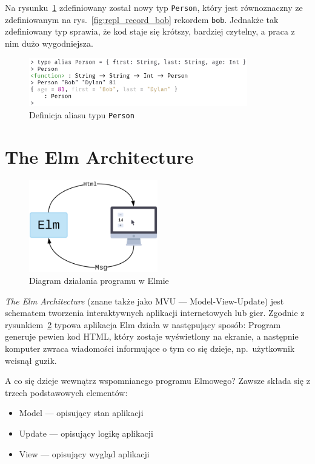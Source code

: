 \documentclass[twoside,a4paper]{report}
\begin{document}
Na rysunku~\ref{fig:repl_type_alias} zdefiniowany został nowy typ \texttt{Person}, który jest równoznaczny ze zdefiniowanym na rys.~\ref{fig:repl_record_bob} rekordem \texttt{bob}.
Jednakże tak zdefiniowany typ sprawia, że kod staje się krótszy, bardziej czytelny, a praca z nim dużo wygodniejsza.
\begin{figure}[H]
    \centering
    \includegraphics[width=0.85\textwidth]{img/repl_type_alias}
    \caption{Definicja aliasu typu \texttt{Person}}\label{fig:repl_type_alias}
\end{figure}

\section{The Elm Architecture}
\begin{figure}[H]
    \centering
    \includegraphics[width=0.5\textwidth]{img/elm_arch.png}
    \caption{Diagram działania programu w Elmie}\label{fig:elm_arch}
\end{figure}

\textit{The Elm Architecture} (znane także jako MVU --- Model-View-Update) jest schematem tworzenia interaktywnych aplikacji internetowych lub gier.
Zgodnie z rysunkiem~\ref{fig:elm_arch} typowa aplikacja Elm działa w następujący sposób:
Program generuje pewien kod HTML, który zostaje wyświetlony na ekranie, a następnie komputer zwraca wiadomości informujące o tym co się dzieje, np.~użytkownik wcisnął guzik.

A co się dzieje wewnątrz wspomnianego programu Elmowego? Zawsze składa się z trzech podstawowych elementów:
\begin{itemize}[noitemsep,topsep=0pt]
    \item Model --- opisujący stan aplikacji
    \item Update --- opisujący logikę aplikacji
    \item View --- opisujący wygląd aplikacji
\end{itemize}
\end{document}
